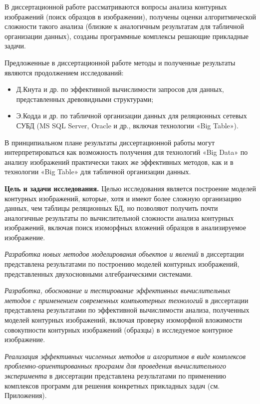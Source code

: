 В диссертационной работе рассматриваются вопросы анализа контурных изображений (поиск образцов в изображении), получены оценки алгоритмической сложности такого анализа (близкие к аналогичным результатам для табличной организации данных), созданы программные комплексы решающие прикладные задачи.

Предложенные в  диссертационной работе методы и полученные результаты являются продолжением исследований: 
\begin{itemize}
\item Д.Кнута и др. по эффективной вычислимости запросов для данных, представленных древовидными структурами;
\item Э.Кодда и др. по табличной организации данных для реляционных сетевых СУБД (MS SQL Server, Oracle и др., включая технологии «Big Table»).
\end{itemize}

В принципиальном плане результаты диссертационной работы могут интерпретироваться как возможность получения для технологий «Big Data» по анализу изображений практически таких же эффективных методов, как и в   технологии  «Big Table» для табличной организации данных.


\textbf{Цель и задачи  исследования.} Целью  исследования является построение  моделей контурных изображений, которые, хотя и имеют более сложную организацию данных, чем  таблицы реляционных БД, но позволяют получить почти аналогичные результаты по вычислительной сложности  анализа контурных изображений, включая поиск изоморфных вложений образцов в анализируемое изображение.

\textit{Разработка новых  методов моделирования объектов и явлений}  в диссертации представлена результатами по построению  моделей контурных изображений, представленных двухосновными алгебраическими системами.

\textit{Разработка, обоснование и тестирование эффективных вычислительных методов с применением современных компьютерных технологий} в диссертации представлена результатами по эффективной вычислимости анализа, полученных  моделей контурных изображений, включая проверку изоморфной вложимости совокупности контурных изображений (образцы) в исследуемое контурное изображение.

\textit{Реализация эффективных численных методов и алгоритмов в виде комплексов проблемно-ориентированных программ для проведения вычислительного эксперимента} в диссертации представлена результатами по применению комплексов программ для решения конкретных прикладных задач  (см. Приложения).

